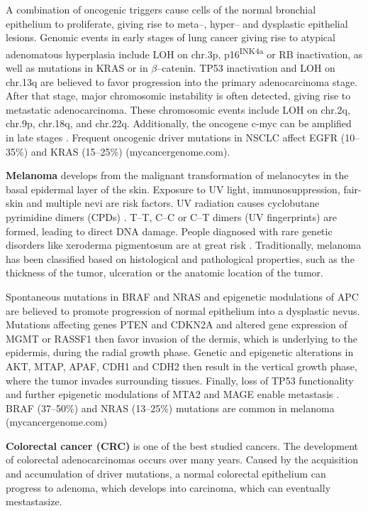 {{{    A combination of oncogenic triggers cause cells of the normal bronchial
    epithelium to proliferate, giving rise to meta--, hyper-- and dysplastic
    epithelial lesions. Genomic events in early stages of lung cancer giving
    rise to atypical adenomatous hyperplasia include LOH on chr.3p,
    p16\textsuperscript{INK4a} or RB inactivation, as well as mutations in KRAS
    or in $\beta$--catenin. TP53 inactivation and LOH on chr.13q are believed to
    favor progression into the primary adenocarcinoma stage. After that stage,
    major chromosomic instability is often detected, giving rise to metastatic
    adenocarcinoma. These chromosomic events include LOH on chr.2q, chr.9p,
    chr.18q, and chr.22q. Additionally, the oncogene c-myc can be amplified in
    late stages {\cite{nsclc}}. Frequent oncogenic driver mutations in NSCLC
    affect EGFR (10--35\%) and KRAS (15--25\%) (mycancergenome.com).

    \textbf{Melanoma} develops from the malignant transformation of melanocytes
    in the basal epidermal layer of the skin. Exposure to UV light,
    immunosuppression, fair-skin and multiple nevi are risk factors. UV
    radiation causes cyclobutane pyrimidine dimers (CPDs) {\cite{melanoma_3}}.
    T--T, C--C or C--T dimers (UV fingerprints) are formed, leading to direct
    DNA damage. People diagnosed with rare genetic disorders like xeroderma
    pigmentosum are at great risk {\cite{xero}}. Traditionally, melanoma has
    been classified based on histological and pathological properties, such as
    the thickness of the tumor, ulceration or the anatomic location of the
    tumor.

    Spontaneous mutations in BRAF and NRAS and epigenetic modulations of APC
    are believed to promote progression of normal epithelium into a dysplastic
    nevus. Mutations affecting genes PTEN and CDKN2A and altered gene
    expression of MGMT or RASSF1 then favor invasion of the dermis, which is
    underlying to the epidermis, during the radial growth phase. Genetic and
    epigenetic alterations in AKT, MTAP, APAF, CDH1 and CDH2 then result in
    the vertical growth phase, where the tumor invades surrounding tissues.
    Finally, loss of TP53 functionality and further epigenetic modulations of
    MTA2 and MAGE enable metastasis {\cite{melanoma}} {\cite{melanoma_2}}.
    BRAF (37--50\%) and NRAS (13--25\%) mutations are common in melanoma
    (mycancergenome.com)

    \textbf{Colorectal cancer (CRC)} is one of the best studied cancers. The
    development of colorectal adenocarcinomas occurs over many years. Caused
    by the acquisition and accumulation of driver mutations, a normal
    colorectal epithelium can progress to adenoma, which develops into
    carcinoma, which can eventually mestastasize.

}}}
